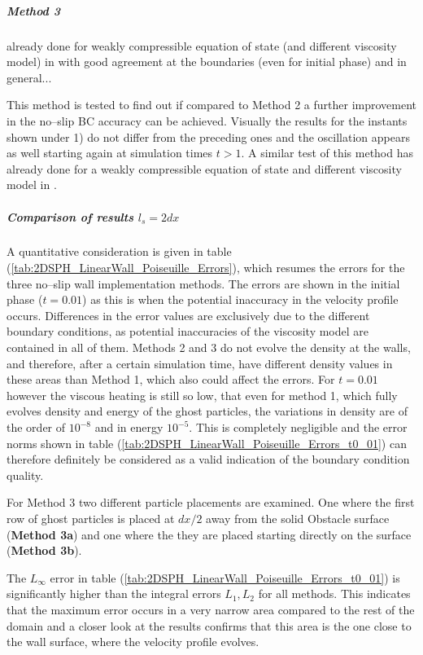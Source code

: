 \documentclass[11pt,a4paper,twoside]{report}
\begin{document}
\subparagraph{Method 3}

already done for weakly compressible equation of state (and different viscosity model) in \cite{Morris1997} with good agreement at the boundaries (even for initial phase) and in general... 

This method is tested to find out if compared to Method 2 a further improvement in the no--slip BC accuracy can be achieved. Visually the results for the instants shown under 1) do not differ from the preceding ones and the oscillation appears as well starting again at simulation times $t>1$. A similar test of this method has already done for a weakly compressible equation of state and different viscosity model in \cite{Morris1997}.


\subparagraph{Comparison of results $l_s=2dx$}

 A quantitative consideration is given in table (\ref{tab:2DSPH_LinearWall_Poiseuille_Errors}), which resumes the errors for the three no--slip wall implementation methods. The errors are shown in the initial phase ($t=0.01$) as this is when the potential inaccuracy in the velocity profile occurs. Differences in the error values are exclusively due to the different boundary conditions, as potential inaccuracies of the viscosity model are contained in all of them. Methods 2 and 3 do not evolve the density at the walls, and therefore, after a certain simulation time, have different density values in these areas than Method 1, which also could affect the errors. For $t=0.01$ however the viscous heating is still so low, that even for method 1, which fully evolves density and energy of the ghost particles, the variations in density are of the order of $10^{-8}$ and in energy $10^{-5}$. This is completely negligible and the error norms shown in table (\ref{tab:2DSPH_LinearWall_Poiseuille_Errors_t0_01}) can therefore definitely be considered as a valid indication of the boundary condition quality.



For Method 3 two different particle placements are examined. One where the first row of ghost particles is placed at $dx/2$ away from the solid Obstacle surface ({\bf Method 3a}) and one where the they are placed starting directly on the surface ({\bf Method 3b}).

The $L_\infty$ error in table (\ref{tab:2DSPH_LinearWall_Poiseuille_Errors_t0_01}) is significantly higher than the integral errors $L_1, L_2$ for all methods. This indicates that the maximum error occurs in a very narrow area compared to the rest of the domain and a closer look at the results confirms that this area is the one close to the wall surface, where the velocity profile evolves.
\end{document}
